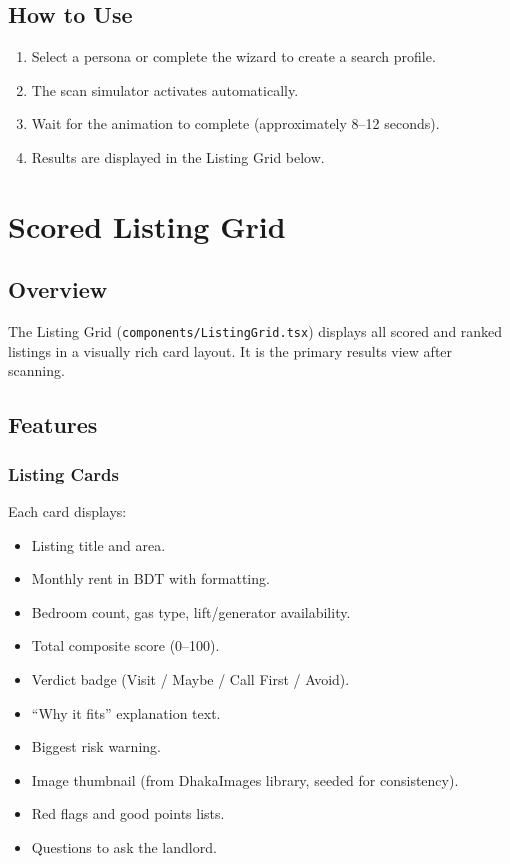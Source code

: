 \documentclass[12pt, a4paper, oneside]{report}
\newcommand{\filepath}[1]{\texttt{\small\color{codeblue}#1}}
\begin{document}
\section{How to Use}

\begin{enumerate}[leftmargin=2em]
  \item Select a persona or complete the wizard to create a search profile.
  \item The scan simulator activates automatically.
  \item Wait for the animation to complete (approximately 8--12 seconds).
  \item Results are displayed in the Listing Grid below.
\end{enumerate}


\chapter{Scored Listing Grid}

\section{Overview}

The Listing Grid (\filepath{components/ListingGrid.tsx}) displays all scored and ranked listings in a visually rich card layout. It is the primary results view after scanning.

\section{Features}

\subsection{Listing Cards}

Each card displays:

\begin{itemize}[leftmargin=2em]
  \item Listing title and area.
  \item Monthly rent in BDT with formatting.
  \item Bedroom count, gas type, lift/generator availability.
  \item Total composite score (0--100).
  \item Verdict badge (Visit / Maybe / Call First / Avoid).
  \item ``Why it fits'' explanation text.
  \item Biggest risk warning.
  \item Image thumbnail (from DhakaImages library, seeded for consistency).
  \item Red flags and good points lists.
  \item Questions to ask the landlord.
\end{itemize}
\end{document}
